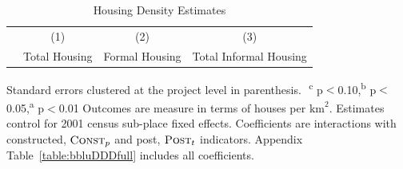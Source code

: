 \documentclass[12pt]{article}
\begin{document}

\begin{table}[hbt!]
\small
\centering
\caption{Housing Density Estimates}\label{table:bbluDDD}
\vspace{-2mm}
\begin{threeparttable}
\begin{tabular}{lCCC}
\toprule
& \small (1) & \small (2) & \small (3) \\
 & \small Total Housing & \small Formal Housing & \small Total Informal Housing  \\ \midrule 

\bottomrule
\end{tabular}
\begin{tablenotes}
\item \footnotesize Standard errors clustered at the project level in parenthesis.\,\, \textsuperscript{c} p$<$0.10,\textsuperscript{b} p$<$0.05,\textsuperscript{a} p$<$0.01 
Outcomes are measure in terms of houses per $\text{km}^{2}$.
Estimates control for 2001 census sub-place fixed effects.
Coefficients are interactions with constructed, $\textsc{Const}_{p}$  and post, $\textsc{Post}_{t}$ indicators.
 Appendix Table~\ref{table:bbluDDDfull} includes all coefficients.
\end{tablenotes}
\end{threeparttable}
\end{table}
\end{document}
